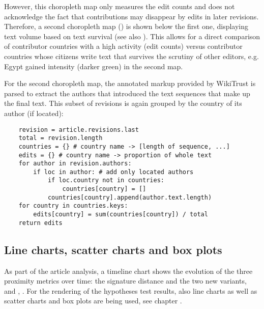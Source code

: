 However, this choropleth map only measures the edit counts and does not acknowledge the fact that contributions may disappear by edits in later revisions. 
Therefore, a second choropleth map () is shown below the first one, displaying text volume  based on text survival (see also ).
This allows for a direct comparison of contributor countries with a high activity (edit counts) versus contributor countries whose citizens write text that survives the scrutiny of other editors, e.g. Egypt gained intensity (darker green) in the second map.


For the second choropleth map, the annotated markup provided by WikiTrust is parsed to extract the authors that introduced the text sequences that make up the final text.
This subset of revisions is again grouped by the country of its author (if located):

\begin{lstlisting}
	revision = article.revisions.last
	total = revision.length
	countries = {} # country name -> [length of sequence, ...]
	edits = {} # country name -> proportion of whole text
	for author in revision.authors:
		if loc in author: # add only located authors
			if loc.country not in countries:
				countries[country] = []
			countries[country].append(author.text.length)
	for country in countries.keys:
		edits[country] = sum(countries[country]) / total
	return edits
\end{lstlisting}

\subsection{Line charts, scatter charts and box plots}


As part of the article analysis, a timeline chart shows the evolution of the three proximity metrics over time: the signature distance and the two new variants,  and , .
For the rendering of the hypotheses test results, also line charts as well as scatter charts and box plots are being used, see chapter .

